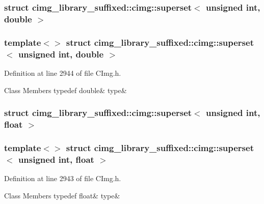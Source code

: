 \subsubsection{struct cimg\+\_\+library\+\_\+suffixed\+:\+:cimg\+:\+:superset$<$ unsigned int, double $>$}
\subsubsection*{template$<$$>$\newline
struct cimg\+\_\+library\+\_\+suffixed\+::cimg\+::superset$<$ unsigned int, double $>$}



Definition at line 2944 of file C\+Img.\+h.

\begin{DoxyFields}{Class Members}
\mbox{\label{namespacecimg__library__suffixed_1_1cimg_afeccf9a3271420bf6ac22ab506e7481e}} 
typedef double&
type&
\\
\hline

\end{DoxyFields}
\label{structcimg__library__suffixed_1_1cimg_1_1superset_3_01unsigned_01int_00_01float_01_4}
\subsubsection{struct cimg\+\_\+library\+\_\+suffixed\+:\+:cimg\+:\+:superset$<$ unsigned int, float $>$}
\subsubsection*{template$<$$>$\newline
struct cimg\+\_\+library\+\_\+suffixed\+::cimg\+::superset$<$ unsigned int, float $>$}



Definition at line 2943 of file C\+Img.\+h.

\begin{DoxyFields}{Class Members}
\mbox{\label{namespacecimg__library__suffixed_1_1cimg_a7b6d1655a8b97209f47e0bc6012ee8aa}} 
typedef float&
type&
\\
\hline

\end{DoxyFields}
\label{structcimg__library__suffixed_1_1cimg_1_1superset_3_01unsigned_01int_00_01int_01_4}
